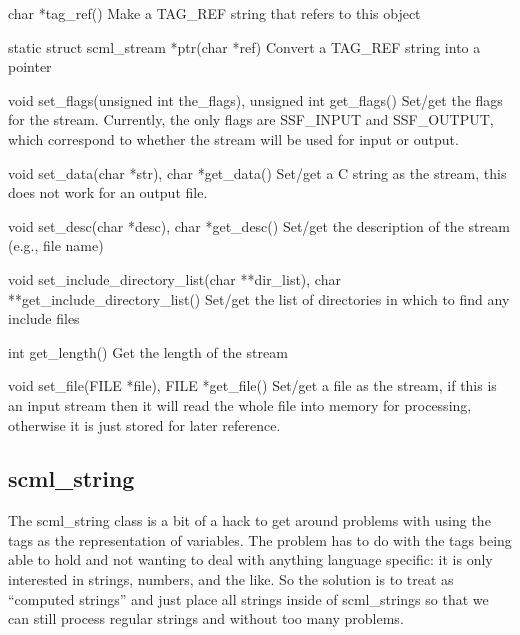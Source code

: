 \begin{cprototypelist}
  \item[char *tag_ref()]
  Make a TAG\_REF string that refers to this object

  \item[static struct scml_stream *ptr(char *ref)]
  Convert a TAG\_REF string into a  pointer

  \item[void set_flags(unsigned int the_flags),
		   unsigned int get_flags()]
  Set/get the flags for the stream.  Currently, the only flags are SSF\_INPUT
  and SSF\_OUTPUT, which correspond to whether the stream will be used for input
  or output.

  \item[void set_data(char *str), char *get_data()]
  Set/get a C string as the stream, this does not work for an output file.

  \item[void set_desc(char *desc), char *get_desc()]
  Set/get the description of the stream (e.g., file name)

  \item[void set_include_directory_list(char **dir_list),
	char **get_include_directory_list()]
  Set/get the list of directories in which to find any include files

  \item[int get_length()]
  Get the length of the stream

  \item[void set_file(FILE *file), FILE *get_file()]
  Set/get a file as the stream, if this is an input stream then it will read
  the whole file into memory for processing, otherwise it is just stored for
  later reference.
\end{cprototypelist}

\subsection{scml\_string}

The scml\_string class is a bit of a hack to get around problems with using
the \PRESC{} tags as the representation of variables.  The problem has to
do with the tags being able to hold \CAST{} and \SCML{} not wanting to deal with
anything language specific: it is only interested in strings, numbers, and the
like.  So the solution is to treat \CAST{} as ``computed strings'' and just
place all strings inside of scml\_strings so that we can still process regular
strings and \CAST{} without too many problems.

